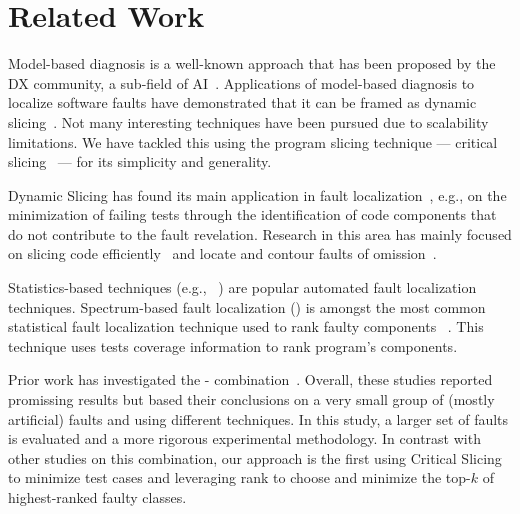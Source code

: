 \documentclass{article}
\begin{document}
\section{Related Work}

Model-based diagnosis is a well-known approach that has been proposed by the DX
community, a sub-field of
AI~\cite{REITER198757,wotawa2002relationship,DEKLEER200325}. Applications of
model-based diagnosis to localize software faults have demonstrated that it can
be framed as dynamic
slicing~\cite{Mayer:2008:EMM:1642931.1642950,mayer2008prioritising,nica2013use}.
Not many interesting techniques have been pursued due to scalability
limitations. We have tackled this using the program slicing technique ---
critical slicing~\cite{DeMillo:1996:CSS:229000.226310} --- for its simplicity
and generality.

Dynamic Slicing has found its main application in fault
localization~\cite{Agrawal:1990:DPS:93542.93576}, e.g.,  on the minimization of
failing tests through the identification of code components that do not
contribute to the fault revelation. Research in this area has mainly focused on
slicing code
efficiently~\cite{Wang:2008:DSJ:1330017.1330021,Wang:2004:UCB:998675.999455} and
locate and contour faults of
omission~\cite{Zhang:2007:TLE:1250734.1250782,Lin:2018:BDE:3238147.3238163}.

Statistics-based techniques (e.g., ~\cite{Pearson:2017:EIF:3097368.3097441}) are
popular automated fault localization techniques. Spectrum-based fault
localization (\sfl{}) is amongst the most common statistical fault localization
technique used to rank faulty components
~\cite{7390282,DBLP:conf/kbse/JonesH05,DBLP:journals/smr/LuciaLJTB14,DBLP:journals/jss/AbreuZGG09}.
This technique uses tests coverage information to rank program's components.

Prior work has investigated the \ds{}-\sfl{}
combination~\cite{Wotawa:2010:FLB:1848650.1849235,Alves:2011:FUD:2190078.2190115,DBLP:conf/ecai/HoferW12,lei-mao-dai-wang-2012,slicing-sfl-repair,christi2018reduce}.
Overall, these studies reported promissing results but based their conclusions
on a very small group of (mostly artificial) faults and using different
techniques. In this
study, a larger set of faults is evaluated and a more rigorous experimental
methodology.
In contrast with other studies on this combination,
our approach is the first using Critical Slicing to minimize test cases
and leveraging \sfl{} rank to choose and minimize the top-$k$ of
highest-ranked faulty classes.
\end{document}
